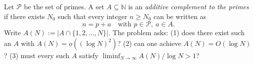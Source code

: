Let $\mathcal{P}$ be the set of primes.
A set $A\subseteq\mathbb{N}$ is an \emph{additive complement to the primes} if there exists $N_0$ such that every integer $n\ge N_0$ can be written as
\[
 n=p+a\quad\text{with }p\in\mathcal{P},\ a\in A.
\]
Write $A(N):=|A\cap\{1,2,\dots,N\}|$.
The problem asks:
(1) does there exist such an $A$ with $A(N)=o((\log N)^2)$?
(2) can one achieve $A(N)=O(\log N)$?
(3) must every such $A$ satisfy $\liminf_{N\to\infty} A(N)/\log N>1$?
